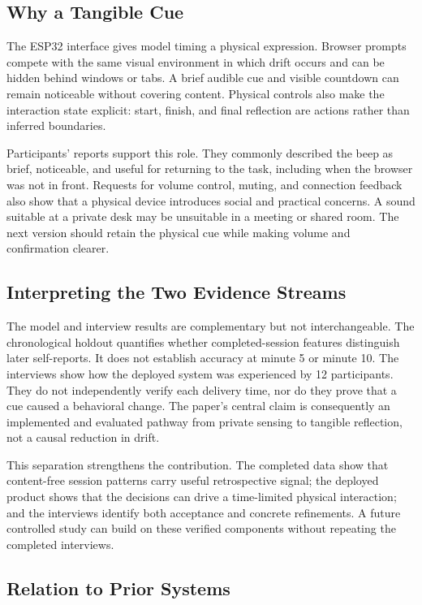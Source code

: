 \documentclass[12pt,a4paper]{article}
\begin{document}
\subsection{Why a Tangible Cue}

The ESP32 interface gives model timing a physical expression. Browser prompts compete with the same visual environment in which drift occurs and can be hidden behind windows or tabs. A brief audible cue and visible countdown can remain noticeable without covering content. Physical controls also make the interaction state explicit: start, finish, and final reflection are actions rather than inferred boundaries.

Participants' reports support this role. They commonly described the beep as brief, noticeable, and useful for returning to the task, including when the browser was not in front. Requests for volume control, muting, and connection feedback also show that a physical device introduces social and practical concerns. A sound suitable at a private desk may be unsuitable in a meeting or shared room. The next version should retain the physical cue while making volume and confirmation clearer.

\subsection{Interpreting the Two Evidence Streams}

The model and interview results are complementary but not interchangeable. The chronological holdout quantifies whether completed-session features distinguish later self-reports. It does not establish accuracy at minute 5 or minute 10. The interviews show how the deployed system was experienced by 12 participants. They do not independently verify each delivery time, nor do they prove that a cue caused a behavioral change. The paper's central claim is consequently an implemented and evaluated pathway from private sensing to tangible reflection, not a causal reduction in drift.

This separation strengthens the contribution. The completed data show that content-free session patterns carry useful retrospective signal; the deployed product shows that the decisions can drive a time-limited physical interaction; and the interviews identify both acceptance and concrete refinements. A future controlled study can build on these verified components without repeating the completed interviews.

\subsection{Relation to Prior Systems}
\end{document}
